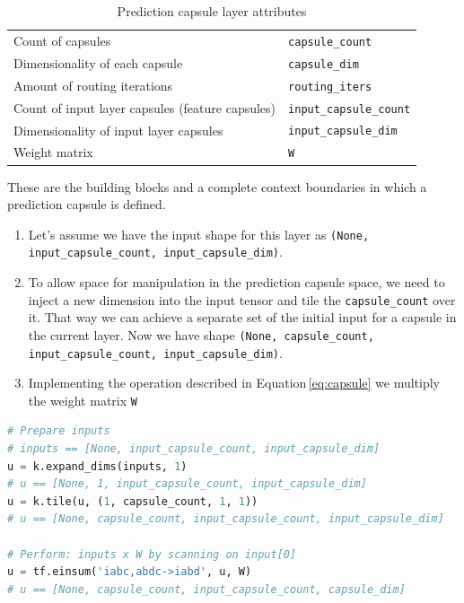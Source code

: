 \begin{table}[ht]
    \centering
    \begin{tabularx}{.8\textwidth}{l|X}
        \toprule
        Count of capsules & \texttt{capsule\_count} \\
        Dimensionality of each capsule & \texttt{capsule\_dim} \\
        Amount of routing iterations & \texttt{routing\_iters} \\
        Count of input layer capsules (feature capsules) & \texttt{input\_capsule\_count} \\
        Dimensionality of input layer capsules & \texttt{input\_capsule\_dim} \\
        Weight matrix & \texttt{W} \\
        \bottomrule
    \end{tabularx}
    \caption{Prediction capsule layer attributes}
\end{table}

These are the building blocks and a complete context boundaries in which a prediction capsule is defined.

\begin{enumerate}
    \item Let's assume we have the input shape for this layer as \texttt{(None, input\_capsule\_count, input\_capsule\_dim)}.
    \item To allow space for manipulation in the prediction capsule space, we need to inject a new dimension into the input tensor and tile the \texttt{capsule\_count} over it. That way we can achieve a separate set of the initial input for a capsule in the current layer. Now we have shape \texttt{(None, capsule\_count, input\_capsule\_count, input\_capsule\_dim)}.
    \item Implementing the operation described in Equation\,\ref{eq:capsule} we multiply the weight matrix \texttt{W}
\end{enumerate}

\begin{lstlisting}[language=Python, caption=Prediction capsule call without routing.]
# Prepare inputs
# inputs == [None, input_capsule_count, input_capsule_dim]
u = k.expand_dims(inputs, 1)
# u == [None, 1, input_capsule_count, input_capsule_dim]
u = k.tile(u, (1, capsule_count, 1, 1))
# u == [None, capsule_count, input_capsule_count, input_capsule_dim]

# Perform: inputs x W by scanning on input[0]
u = tf.einsum('iabc,abdc->iabd', u, W)
# u == [None, capsule_count, input_capsule_count, capsule_dim]
\end{lstlisting}

